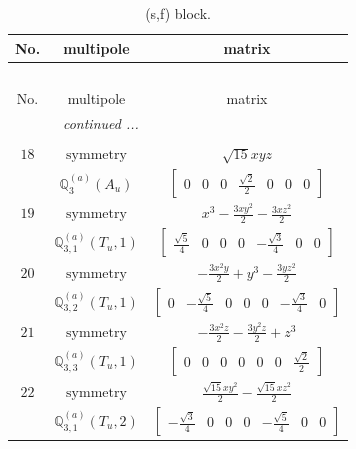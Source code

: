 \documentclass[fleqn,8pt,landscape]{jsarticle}
\begin{document}
\begin{longtable}{ccc}
\caption{(s,f) block.}
 \\
 \hline \hline
No. & multipole & matrix \\ \hline \endfirsthead

\multicolumn{2}{l}{\tablename\ \thetable{}} \\
 \hline \hline
No. & multipole & matrix \\ \hline \endhead

 \hline \hline
\multicolumn{2}{r}{\footnotesize\it continued ...} \\ \endfoot

 \hline \hline
\multicolumn{2}{r}{} \\ \endlastfoot

$ 18 $ & $ \text{symmetry} $ & $ \sqrt{15} x y z $ \\
$  $ & $ \mathbb{Q}_{3}^{(a)}(A_{u}) $ & $ \begin{bmatrix} 0 & 0 & 0 & \frac{\sqrt{2}}{2} & 0 & 0 & 0 \end{bmatrix} $ \\ \hline
$ 19 $ & $ \text{symmetry} $ & $ x^{3} - \frac{3 x y^{2}}{2} - \frac{3 x z^{2}}{2} $ \\
$  $ & $ \mathbb{Q}_{3,1}^{(a)}(T_{u},1) $ & $ \begin{bmatrix} \frac{\sqrt{5}}{4} & 0 & 0 & 0 & - \frac{\sqrt{3}}{4} & 0 & 0 \end{bmatrix} $ \\ \hline
$ 20 $ & $ \text{symmetry} $ & $ - \frac{3 x^{2} y}{2} + y^{3} - \frac{3 y z^{2}}{2} $ \\
$  $ & $ \mathbb{Q}_{3,2}^{(a)}(T_{u},1) $ & $ \begin{bmatrix} 0 & - \frac{\sqrt{5}}{4} & 0 & 0 & 0 & - \frac{\sqrt{3}}{4} & 0 \end{bmatrix} $ \\ \hline
$ 21 $ & $ \text{symmetry} $ & $ - \frac{3 x^{2} z}{2} - \frac{3 y^{2} z}{2} + z^{3} $ \\
$  $ & $ \mathbb{Q}_{3,3}^{(a)}(T_{u},1) $ & $ \begin{bmatrix} 0 & 0 & 0 & 0 & 0 & 0 & \frac{\sqrt{2}}{2} \end{bmatrix} $ \\ \hline
$ 22 $ & $ \text{symmetry} $ & $ \frac{\sqrt{15} x y^{2}}{2} - \frac{\sqrt{15} x z^{2}}{2} $ \\
$  $ & $ \mathbb{Q}_{3,1}^{(a)}(T_{u},2) $ & $ \begin{bmatrix} - \frac{\sqrt{3}}{4} & 0 & 0 & 0 & - \frac{\sqrt{5}}{4} & 0 & 0 \end{bmatrix} $ \\ \hline

\end{longtable}
\end{document}
